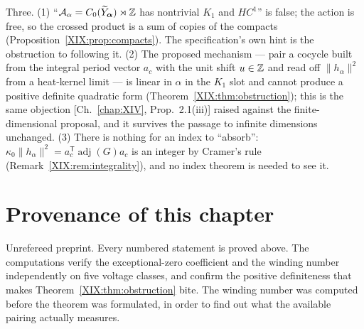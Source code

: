 \begin{remark}\label{XIX:rem:corrections}
Three. (1) ``$\mathcal{A}_\alpha=C_0(\widetilde Y_{\bm\alpha})\rtimes\mathbb{Z}$ has nontrivial $K_1$ and $HC^1$'' is false;
the action is free, so the crossed product is a sum of copies of the compacts
(Proposition~\ref{XIX:prop:compacts}). The specification's own hint is the obstruction to
following it. (2) The proposed mechanism --- pair a cocycle built from the integral period
vector $a_c$ with the unit shift $u\in\mathbb{Z}$ and read off $\|h_\alpha\|^2$ from a heat-kernel
limit --- is linear in $\alpha$ in the $K_1$ slot and cannot produce a positive definite
quadratic form (Theorem~\ref{XIX:thm:obstruction}); this is the same objection
[Ch.~\ref{chap:XIV}, Prop.~2.1(iii)] raised against the finite-dimensional proposal, and it survives the
passage to infinite dimensions unchanged. (3) There is nothing for an index to
``absorb'': $\kappa_0\|h_\alpha\|^2=a_c^{\mathsf T}\operatorname{adj}(G)a_c$ is an integer
by Cramer's rule (Remark~\ref{XIX:rem:integrality}), and no index theorem is needed to see it.
\end{remark}

\section*{Provenance of this chapter}

Unrefereed preprint. Every numbered statement is proved above. The computations verify
the exceptional-zero coefficient and the winding number independently on five voltage
classes, and confirm the positive definiteness that makes
Theorem~\ref{XIX:thm:obstruction} bite. The winding number was computed before the theorem was
formulated, in order to find out what the available pairing actually measures.
